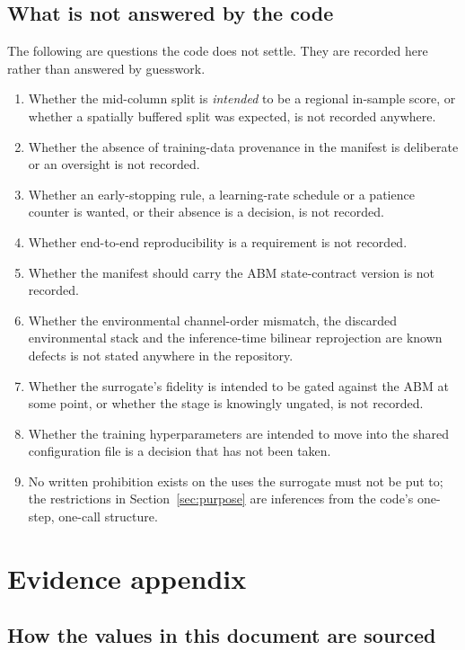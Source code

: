 \documentclass[11pt,a4paper]{article}
\begin{document}
\subsection{What is not answered by the code}

The following are questions the code does not settle. They are recorded here
rather than answered by guesswork.

\begin{enumerate}
\item Whether the mid-column split is \emph{intended} to be a regional
      in-sample score, or whether a spatially buffered split was expected,
      is not recorded anywhere.
\item Whether the absence of training-data provenance in the manifest is
      deliberate or an oversight is not recorded.
\item Whether an early-stopping rule, a learning-rate schedule or a patience
      counter is wanted, or their absence is a decision, is not recorded.
\item Whether end-to-end reproducibility is a requirement is not recorded.
\item Whether the manifest should carry the ABM state-contract version is not
      recorded.
\item Whether the environmental channel-order mismatch, the discarded
      environmental stack and the inference-time bilinear reprojection are
      known defects is not stated anywhere in the
      repository.
\item Whether the surrogate's fidelity is intended to be gated against the
      ABM at some point, or whether the stage is knowingly ungated, is not
      recorded.
\item Whether the training hyperparameters are intended to move into the
      shared configuration file is a decision that has not been taken.
\item No written prohibition exists on the uses the surrogate must not be put
      to; the restrictions in Section~\ref{sec:purpose} are inferences from
      the code's one-step, one-call structure.
\end{enumerate}

\section{Evidence appendix}

\subsection{How the values in this document are sourced}
\end{document}
